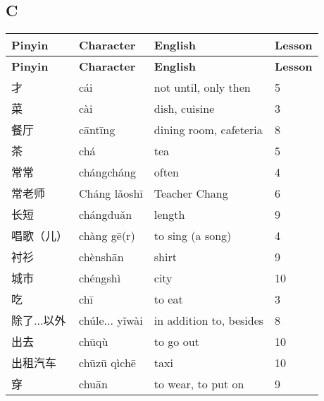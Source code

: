 \documentclass[12pt]{article}
\newcommand{\vocabitem}[4]{%
  #1 & #2 & #3 & #4 \\ \midrule
}
\begin{document}
\subsection*{C}
\begin{longtable}{P{\dimexpr\textwidth/4\relax}P{\dimexpr\textwidth/4\relax}P{\dimexpr\textwidth/4\relax}P{\dimexpr\textwidth/4\relax}}
\toprule
\textbf{Pinyin} & \textbf{Character} & \textbf{English} & \textbf{Lesson} \\
\midrule
\endfirsthead
\toprule
\textbf{Pinyin} & \textbf{Character} & \textbf{English} & \textbf{Lesson} \\
\midrule
\endhead
\vocabitem{才}{cái}{not until, only then}{5}
\vocabitem{菜}{cài}{dish, cuisine}{3}
\vocabitem{餐厅}{cāntīng}{dining room, cafeteria}{8}
\vocabitem{茶}{chá}{tea}{5}
\vocabitem{常常}{chángcháng}{often}{4}
\vocabitem{常老师}{Cháng lǎoshī}{Teacher Chang}{6}
\vocabitem{长短}{chángduǎn}{length}{9}
\vocabitem{唱歌（儿）}{chàng gē(r)}{to sing (a song)}{4}
\vocabitem{衬衫}{chènshān}{shirt}{9}
\vocabitem{城市}{chéngshì}{city}{10}
\vocabitem{吃}{chī}{to eat}{3}
\vocabitem{除了...以外}{chúle... yǐwài}{in addition to, besides}{8}
\vocabitem{出去}{chūqù}{to go out}{10}
\vocabitem{出租汽车}{chūzū qìchē}{taxi}{10}
\vocabitem{穿}{chuān}{to wear, to put on}{9}
\bottomrule
\end{longtable}

\end{document}
